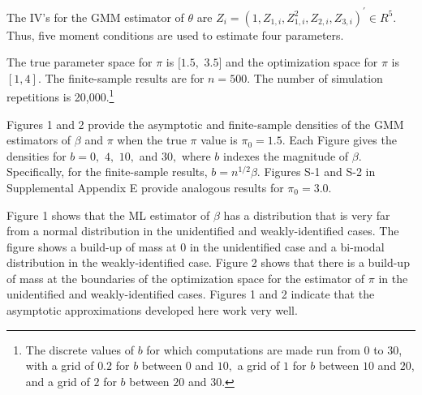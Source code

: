 \documentclass[12pt,titlepage,final,oneside,letterpaper]{article}
\begin{document}
The IV's for the GMM estimator of $\theta $ are $%
Z_{i}=(1,Z_{1,i},Z_{1,i}^{2},Z_{2,i},Z_{3,i})^{\prime }\in R^{5}.$ Thus,
five moment conditions are used to estimate four parameters.

The true parameter space for $\pi $ is $[1.5,$ $3.5]$ and the optimization
space for $\pi $ is $[1,4].$ The finite-sample results are for $n=500.$ The
number of simulation repetitions is 20,000.\footnote{%
The discrete values of $b$ for which computations are made run from $0$ to $%
30$, with a grid of $0.2$ for $b$ between $0$ and $10,$ a grid of $1$ for $b$
between $10$ and $20$, and a grid of $2$ for $b$ between $20$ and $30.$}

Figures 1 and 2 provide the asymptotic and finite-sample densities of the
GMM estimators of $\beta $ and $\pi $ when the true $\pi $ value is $\pi
_{0}=1.5$. Each Figure gives the densities for $b=0,$ $4,$ $10,$ and $30,$
where $b$ indexes the magnitude of $\beta $. Specifically, for the
finite-sample results, $b=n^{1/2}\beta .$ Figures S-1 and S-2 in
Supplemental Appendix E provide analogous results for $\pi _{0}=3.0.$

Figure 1 shows that the ML estimator of $\beta $ has a distribution that is
very far from a normal distribution in the unidentified and
weakly-identified cases. The figure shows a build-up of mass at $0$ in the
unidentified case and a bi-modal distribution in the weakly-identified case.
Figure 2 shows that there is a build-up of mass at the boundaries of the
optimization space for the estimator of $\pi $ in the unidentified and
weakly-identified cases. Figures 1 and 2 indicate that the asymptotic
approximations developed here work very well.


\end{document}
